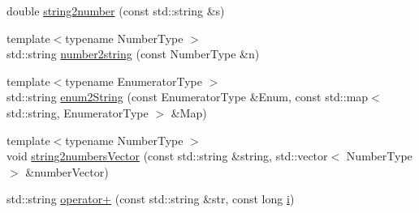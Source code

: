 \begin{DoxyCompactItemize}
\item 
double \hyperlink{namespaceLifeV_a95341022bde9111ea53dfe204cbe70ae}{string2number} (const std\-::string \&s)
\item 
{\footnotesize template$<$typename Number\-Type $>$ }\\std\-::string \hyperlink{namespaceLifeV_a3c2a31cefb08654a69273a1a3bf11fac}{number2string} (const Number\-Type \&n)
\item 
{\footnotesize template$<$typename Enumerator\-Type $>$ }\\std\-::string \hyperlink{namespaceLifeV_a2e64a35012f78d9ab021477590e3bfaf}{enum2\-String} (const Enumerator\-Type \&Enum, const std\-::map$<$ std\-::string, Enumerator\-Type $>$ \&Map)
\item 
{\footnotesize template$<$typename Number\-Type $>$ }\\void \hyperlink{namespaceLifeV_a5f2c3319750ceebbeb2a3bb374a2596b}{string2numbers\-Vector} (const std\-::string \&string, std\-::vector$<$ Number\-Type $>$ \&number\-Vector)
\item 
std\-::string \hyperlink{namespaceLifeV_aed80af702e5521c5fc90b0c33bbd5af3}{operator+} (const std\-::string \&str, const long \hyperlink{matrici_8m_a6f6ccfcf58b31cb6412107d9d5281426}{i})
\end{DoxyCompactItemize}


